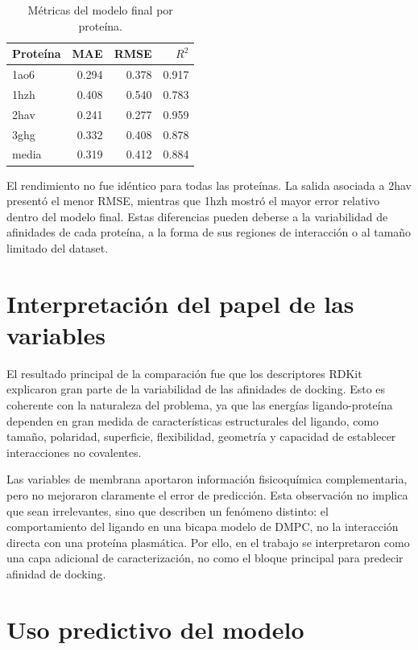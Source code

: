 \documentclass[
  spanish,
  a4paper,
  12pt,
  oneside,
  openany]{memoir}
\begin{document}
\begin{table}

\caption{\label{tab:code-anexo-metricas-proteina}Métricas del modelo final por proteína.}
\centering
\begin{tabular}[t]{lrrr}
\toprule
Proteína & MAE & RMSE & $R^{2}$\\
\midrule
1ao6 & 0.294 & 0.378 & 0.917\\
1hzh & 0.408 & 0.540 & 0.783\\
2hav & 0.241 & 0.277 & 0.959\\
3ghg & 0.332 & 0.408 & 0.878\\
media & 0.319 & 0.412 & 0.884\\
\bottomrule
\end{tabular}
\end{table}

El rendimiento no fue idéntico para todas las proteínas. La salida
asociada a 2hav presentó el menor RMSE, mientras que 1hzh mostró el
mayor error relativo dentro del modelo final. Estas diferencias pueden
deberse a la variabilidad de afinidades de cada proteína, a la forma de
sus regiones de interacción o al tamaño limitado del dataset.

\section{Interpretación del papel de las variables}

El resultado principal de la comparación fue que los descriptores RDKit
explicaron gran parte de la variabilidad de las afinidades de docking.
Esto es coherente con la naturaleza del problema, ya que las energías
ligando-proteína dependen en gran medida de características
estructurales del ligando, como tamaño, polaridad, superficie,
flexibilidad, geometría y capacidad de establecer interacciones no
covalentes.

Las variables de membrana aportaron información fisicoquímica
complementaria, pero no mejoraron claramente el error de predicción.
Esta observación no implica que sean irrelevantes, sino que describen un
fenómeno distinto: el comportamiento del ligando en una bicapa modelo de
DMPC, no la interacción directa con una proteína plasmática. Por ello,
en el trabajo se interpretaron como una capa adicional de
caracterización, no como el bloque principal para predecir afinidad de
docking.

\section{Uso predictivo del modelo}
\end{document}
